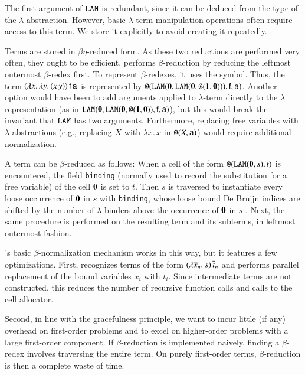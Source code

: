 The first argument of $\texttt{LAM}$ is
redundant, since it can be deduced from the type of the $\lambda$-abstraction.
However, basic $\lambda$-term manipulation operations often require access to
this term. We store it explicitly to avoid creating it repeatedly.

Terms are stored in $\beta\eta$-reduced form. As these two reductions are
performed very often, they ought to be efficient. \ehohii{}
performs $\beta$-reduction by reducing the leftmost outermost $\beta$-redex
first. To represent $\beta$-redexes, it uses the \internalat{} symbol. Thus,
the term $(\lambda
x.\, \lambda y.\,  (x \, y)) \, \mathsf{f} \, \mathsf{a}$ is represented by
$\texttt{@}(\texttt{LAM}(\mathbf{0}, \texttt{LAM}(\mathbf{0}, \texttt{@}(\mathbf{1}, \mathbf{0}))),
\mathsf{f}, \mathsf{a})$. Another option would have been to add arguments applied to
$\lambda$-term directly to the $\lambda$ representation (as in
$\texttt{LAM}(\mathbf{0}, \texttt{LAM}(\mathbf{0}, \allowbreak \texttt{@}(\mathbf{1}, \mathbf{0})),
\mathsf{f}, \mathsf{a})$), but this would break the invariant
that $\texttt{LAM}$ has two arguments. Furthermore, replacing free
variables with $\lambda$-abstractions (e.g., replacing $X$ with $\lambda
x. \, x$ in $\texttt{@}(X, \mathsf{a})$) would require additional normalization.

A term can be $\beta$-reduced as follows: When a cell of the
form $ \texttt{@}(\texttt{LAM}(\mathbf{0}, s),t)$ is encountered, the field
\texttt{binding} (normally used to record the substitution for a free variable) of the
cell $\mathbf{0}$ is set to $t$. Then $s$ is traversed to instantiate every
loose occurrence of $\mathbf{0}$ in $s$ with \texttt{binding}, whose loose
bound De Bruijn indices are shifted by the number of $\lambda$ binders above
the occurrence of $\mathbf{0}$ in $s$ \cite{fk-01-deBruijn}. Next, the same
procedure is performed on the resulting term and its subterms, in
leftmost outermost fashion.

\ehohii{}'s basic $\beta$-normalization mechanism works in this way, but it
features a few optimizations.
First, \ehohii{} recognizes terms of the form $(\lambda \overline{x}_n.\> s) \,\overline{t}_n$ 
and performs parallel replacement of the bound variables $x_i$ with
$t_i$. Since intermediate terms are not constructed, this reduces the number of
recursive function calls and calls to the cell allocator.

Second, in line with the gracefulness principle, we want \ehohii{} to incur
little (if any) overhead on first-order problems and to
excel on higher-order problems with a large first-order component. If
$\beta$-reduction is implemented naively, finding a $\beta$-redex involves
traversing the entire term. On purely first-order terms, $\beta$-reduction
is then a complete waste of time.

